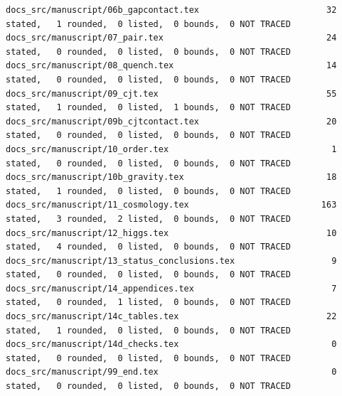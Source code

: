 \documentclass[
  10pt,
]{article}
\begin{document}
\begin{verbatim}
docs_src/manuscript/06b_gapcontact.tex                         32 stated,   1 rounded,  0 listed,  0 bounds,  0 NOT TRACED
docs_src/manuscript/07_pair.tex                                24 stated,   0 rounded,  0 listed,  0 bounds,  0 NOT TRACED
docs_src/manuscript/08_quench.tex                              14 stated,   0 rounded,  0 listed,  0 bounds,  0 NOT TRACED
docs_src/manuscript/09_cjt.tex                                 55 stated,   1 rounded,  0 listed,  1 bounds,  0 NOT TRACED
docs_src/manuscript/09b_cjtcontact.tex                         20 stated,   0 rounded,  0 listed,  0 bounds,  0 NOT TRACED
docs_src/manuscript/10_order.tex                                1 stated,   0 rounded,  0 listed,  0 bounds,  0 NOT TRACED
docs_src/manuscript/10b_gravity.tex                            18 stated,   1 rounded,  0 listed,  0 bounds,  0 NOT TRACED
docs_src/manuscript/11_cosmology.tex                          163 stated,   3 rounded,  2 listed,  0 bounds,  0 NOT TRACED
docs_src/manuscript/12_higgs.tex                               10 stated,   4 rounded,  0 listed,  0 bounds,  0 NOT TRACED
docs_src/manuscript/13_status_conclusions.tex                   9 stated,   0 rounded,  0 listed,  0 bounds,  0 NOT TRACED
docs_src/manuscript/14_appendices.tex                           7 stated,   0 rounded,  1 listed,  0 bounds,  0 NOT TRACED
docs_src/manuscript/14c_tables.tex                             22 stated,   1 rounded,  0 listed,  0 bounds,  0 NOT TRACED
docs_src/manuscript/14d_checks.tex                              0 stated,   0 rounded,  0 listed,  0 bounds,  0 NOT TRACED
docs_src/manuscript/99_end.tex                                  0 stated,   0 rounded,  0 listed,  0 bounds,  0 NOT TRACED


\end{verbatim}
\end{document}

